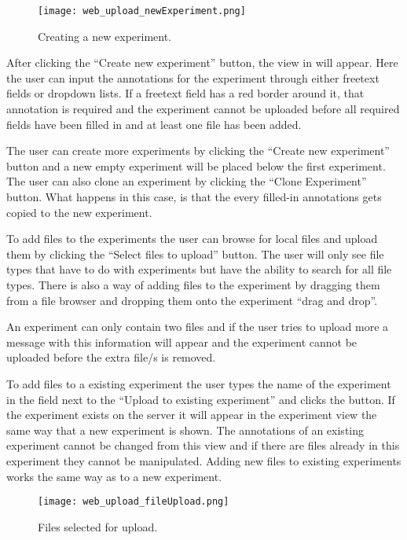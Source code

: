 \begin{figure}[h]
\centering
\texttt{[image: web\_upload\_newExperiment.png]}
\caption{\label{fig:web_upload_newExperiment}Creating a new experiment.}
\end{figure}

After clicking the “Create new experiment” button, the view in  will appear. Here the user can input the annotations for the experiment through either freetext fields or dropdown lists. If a freetext field has a red border around it, that annotation is required and the experiment cannot be uploaded before all required fields have been filled in and at least one file has been added.

The user can create more experiments by clicking the “Create new experiment” button and a new empty experiment will be placed below the first experiment. The user can also clone an experiment by clicking the “Clone Experiment” button. What happens in this case, is that the every filled-in annotations gets copied to the new experiment.

To add files to the experiments the user can browse for local files and upload them by clicking the “Select files to upload” button. The user will only see file types that have to do with experiments but have the ability to search for all file types. There is also a way of adding files to the experiment by dragging them from a file browser and dropping them onto the experiment “drag and drop”.

An experiment can only contain two  files and if the user tries to upload more a message with this information will appear and the experiment cannot be uploaded before the extra  file/s is removed. 

To add files to a existing experiment the user types the name of the experiment in the field next to the “Upload to existing experiment” and clicks the button. If the experiment exists on the server it will appear in the experiment view the same way that a new experiment is shown. The annotations of an existing experiment cannot be changed from this view and if there are files already in this experiment they cannot be manipulated. Adding new files to existing experiments works the same way as to a new experiment.

\begin{figure}[h]
\centering
\texttt{[image: web\_upload\_fileUpload.png]}
\caption{\label{fig:web_upload_fileUpload}Files selected for upload.}
\end{figure}
 
